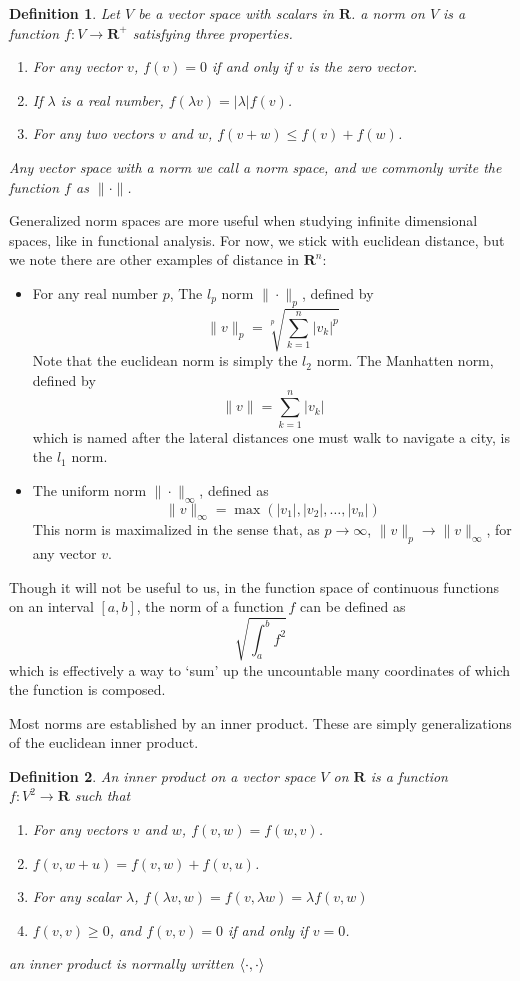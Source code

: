 \documentclass[12pt]{amsbook}
\theoremstyle{plain}
\newtheorem{definition}{Definition}
\theoremstyle{definition}
\DeclarePairedDelimiter{\inner}{\langle}{\rangle}
\begin{document}
\begin{definition}
  Let $V$ be a vector space with scalars in $\mathbf{R}$. a norm on $V$ is a function $f:V \to \mathbf{R}^+$ satisfying three properties.
  \begin{enumerate}
    \item For any vector $v$, $f(v) = 0$ if and only if $v$ is the zero vector.
    \item If $\lambda$ is a real number, $f(\lambda v) = |\lambda|f(v)$.
    \item For any two vectors $v$ and $w$, $f(v + w) \leq f(v) + f(w)$.
  \end{enumerate}
  Any vector space with a norm we call a norm space, and we commonly write the function $f$ as $\| \cdot \|$.
\end{definition}

Generalized norm spaces are more useful when studying infinite dimensional spaces, like in functional analysis. For now, we stick with euclidean distance, but we note there are other examples of distance in $\mathbf{R}^n$:

\begin{itemize}
  \item For any real number $p$, The $l_p$ norm $\| \cdot \|_p$, defined by
  \[ \|v\|_p = \sqrt[p]{\sum_{k = 1}^n |v_k|^p} \]
  Note that the euclidean norm is simply the $l_2$ norm. The Manhatten norm, defined by
  \[ \|v\| = \sum_{k = 1}^n |v_k| \]
  which is named after the lateral distances one must walk to navigate a city, is the $l_1$ norm.
  \item The uniform norm $\| \cdot \|_\infty$, defined as
  \[ \| v \|_\infty = \max(|v_1|, |v_2|, \dots, |v_n|) \]
  This norm is maximalized in the sense that, as $p \to \infty$, $\|v\|_p \to \|v\|_\infty$, for any vector $v$.
\end{itemize}

Though it will not be useful to us, in the function space of continuous functions on an interval $[a,b]$, the norm of a function $f$ can be defined as
%
\[ \sqrt{\int_a^b f^2} \]
%
which is effectively a way to `sum' up the uncountable many coordinates of which the function is composed.

Most norms are established by an inner product. These are simply generalizations of the euclidean inner product.

\begin{definition}
  An inner product on a vector space $V$ on $\mathbf{R}$ is a function $f:V^2 \to \mathbf{R}$ such that
  \begin{enumerate}
    \item For any vectors $v$ and $w$, $f(v,w) = f(w,v)$.
    \item $f(v,w+u) = f(v,w) + f(v,u)$.
    \item For any scalar $\lambda$, $f(\lambda v,w) = f(v,\lambda w) = \lambda f(v,w)$
    \item $f(v,v) \geq 0$, and $f(v,v) = 0$ if and only if $v = 0$.
  \end{enumerate}
  an inner product is normally written $\inner{\cdot, \cdot}$
\end{definition}
\end{document}
